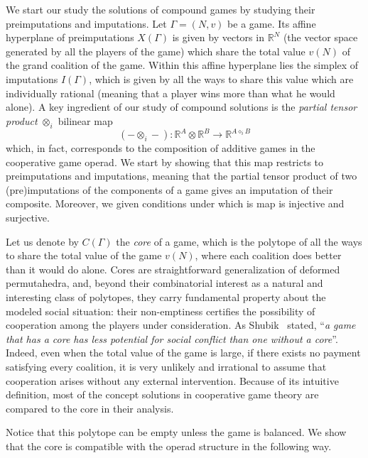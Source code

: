 \documentclass[a4paper,12pt]{amsart}
\begin{document}
\medskip

We start our study the solutions of compound games by studying their preimputations and imputations. Let $\Gamma = (N,v)$ be a game. Its affine hyperplane of preimputations $X(\Gamma)$ is given by vectors in $\mathbb{R}^N$ (the vector space generated by all the players of the game) which share the total value $v(N)$ of the grand coalition of the game. Within this affine hyperplane lies the simplex of imputations $I(\Gamma)$, which is given by all the ways to share this value which are individually rational (meaning that a player wins more than what he would alone). A key ingredient of our study of compound solutions is the \textit{partial tensor product} $\otimes_i$ bilinear map
\[
(- \otimes_i -): \mathbb{R}^{A} \otimes \mathbb{R}^{B} \longrightarrow \mathbb{R}^{A \diamond_i B}
\]
which, in fact, corresponds to the composition of additive games in the cooperative game operad. We start by showing that this map restricts to preimputations and imputations, meaning that the partial tensor product of two (pre)imputations of the components of a game gives an imputation of their composite. Moreover, we given conditions under which is map is injective and surjective. 

\medskip

Let us denote by $C(\Gamma)$ the \textit{core} of a game, which is the polytope of all the ways to share the total value of the game $v(N)$, where each coalition does better than it would do alone. Cores are straightforward generalization of deformed permutahedra, and, beyond their combinatorial interest as a natural and interesting class of polytopes, they carry fundamental property about the modeled social situation:  their non-emptiness certifies the possibility of cooperation among the players under consideration. As Shubik~\cite{shubik1982game} stated, ``\emph{a game that has a core has less potential for social
conflict than one without a core}''. Indeed, even when the total value of the game is large, if there exists no payment satisfying every coalition, it is very unlikely and irrational to assume that cooperation arises without any external intervention. Because of its intuitive definition, most of the concept solutions in cooperative game theory are compared to the core in their analysis. 

\medskip 

Notice that this polytope can be empty unless the game is balanced. We show that the core is compatible with the operad structure in the following way. 
\end{document}
